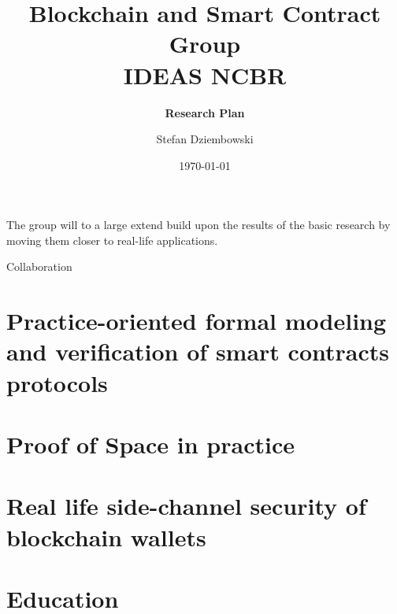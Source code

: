 \documentclass{article}
\title{\textbf{Blockchain and Smart Contract Group\\ IDEAS NCBR}}
\subtitle{\textbf{Research Plan}}
\date{\today}
\author{Stefan Dziembowski}
\begin{document}
	
\maketitle

The group will to a large extend build upon the results of the basic research 
by moving them closer to real-life applications.

Collaboration



\section{Practice-oriented formal modeling and verification of smart contracts protocols}

\section{Proof of Space in practice}

\section{Real life side-channel security of blockchain wallets}

\section{Education}
\end{document}

